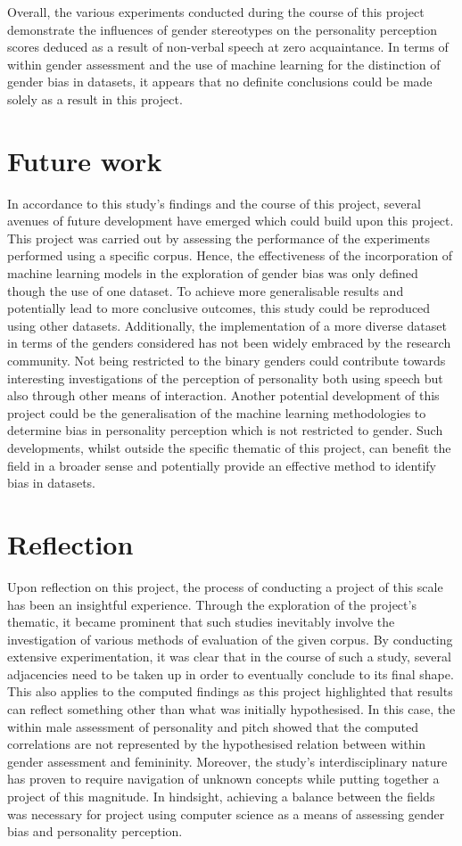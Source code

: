 \documentclass{l4proj}
\begin{document}
Overall, the various experiments conducted during the course of this project demonstrate the influences of gender stereotypes on the personality perception scores deduced as a result of non-verbal speech at zero acquaintance. In terms of within gender assessment and the use of machine learning for the distinction of gender bias in datasets, it appears that no definite conclusions could be made solely as a result in this project. 

\section{Future work}
In accordance to this study’s findings and the course of this project, several avenues of future development have emerged which could build upon this project. 
This project was carried out by assessing the performance of the experiments performed using a specific corpus. Hence, the effectiveness of the incorporation of machine learning models in the exploration of gender bias was only defined though the use of one dataset. To achieve more generalisable results and potentially lead to more conclusive outcomes, this study could be reproduced using other datasets. Additionally, the implementation of a more diverse dataset in terms of the genders considered has not been widely embraced by the research community. Not being restricted to the binary genders could contribute towards interesting investigations of the perception of personality both using speech but also through other means of interaction. 
Another potential development of this project could be the generalisation of the machine learning methodologies to determine bias in personality perception which is not restricted to gender. Such developments, whilst outside the specific thematic of this project, can benefit the field in a broader sense and potentially provide an effective method to identify bias in datasets. 

\section{Reflection}
Upon reflection on this project, the process of conducting a project of this scale has been an insightful experience. Through the exploration of the project’s thematic, it became prominent that such studies inevitably involve the investigation of various methods of evaluation of the given corpus. By conducting extensive experimentation, it was clear that in the course of such a study, several adjacencies need to be taken up in order to eventually conclude to its final shape. 
This also applies to the computed findings as this project highlighted that results can reflect something other than what was initially hypothesised. In this case, the within male assessment of personality and pitch showed that the computed correlations are not represented by the hypothesised relation between within gender assessment and femininity. 
Moreover, the study's interdisciplinary nature has proven to require navigation of unknown concepts while putting together a project of this magnitude. In hindsight, achieving a balance between the fields was necessary for project using computer science as a means of assessing gender bias and personality perception.
\end{document}
